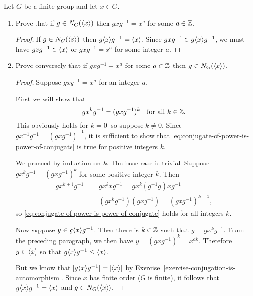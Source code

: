  Let $G$ be a finite group and let $x\in G$.
\begin{enumerate}
\item Prove that if $g\in N_G(\langle{x}\rangle)$ then $gxg^{-1} = x^a$ for some
  $a\in\mathbb{Z}$.
  \begin{proof}
    If $g\in N_G(\langle{x}\rangle)$ then $g\langle{x}\rangle g^{-1} = \langle{x}\rangle$. Since
    $gxg^{-1}\in g\langle{x}\rangle g^{-1}$, we must have $gxg^{-1}\in\langle{x}\rangle$ or
    $gxg^{-1} = x^a$ for some integer $a$.
  \end{proof}
\item Prove conversely that if $gxg^{-1} = x^a$ for some $a\in\mathbb{Z}$ then
  $g\in N_G(\langle{x}\rangle)$.
  \begin{proof}
    Suppose $gxg^{-1} = x^a$ for an integer $a$.

    First we will show that
    \begin{equation}
      \label{eq:conjugate-of-power-is-power-of-conjugate}
      gx^kg^{-1} = (gxg^{-1})^k
      \quad\text{for all $k\in\mathbb{Z}$}.
    \end{equation}
    This obviously holds for $k = 0$, so suppose $k\neq0$. Since
    $gx^{-1}g^{-1} = (gxg^{-1})^{-1}$, it is sufficient to show that
    \eqref{eq:conjugate-of-power-is-power-of-conjugate} is true for
    positive integers $k$.

    We proceed by induction on $k$. The base case is trivial. Suppose
    $gx^kg^{-1} = (gxg^{-1})^k$ for some positive integer $k$. Then
    \begin{align*}
      gx^{k+1}g^{-1}
      &= gx^kxg^{-1} = gx^k(g^{-1}g)xg^{-1} \\
      &= (gx^kg^{-1})(gxg^{-1}) = (gxg^{-1})^{k+1},
    \end{align*}
    so \eqref{eq:conjugate-of-power-is-power-of-conjugate} holds for
    all integers $k$.

    Now suppose $y\in g\langle{x}\rangle g^{-1}$. Then there is $k\in\mathbb{Z}$ such
    that $y = gx^kg^{-1}$. From the preceding paragraph, we then have
    $y = (gxg^{-1})^k = x^{ak}$. Therefore $y\in\langle{x}\rangle$ so that
    $g\langle{x}\rangle g^{-1}\leq\langle{x}\rangle$.

    But we know that $\lvert{g\langle{x}\rangle g^{-1}}\rvert = \lvert{\langle{x}\rangle}\rvert$ by
    Exercise~\ref{exercise-conjugation-is-automorphism}. Since $x$ has
    finite order ($G$ is finite), it follows that
    $g\langle{x}\rangle g^{-1} = \langle{x}\rangle$ and $g\in N_G(\langle{x}\rangle)$.
  \end{proof}
\end{enumerate}

